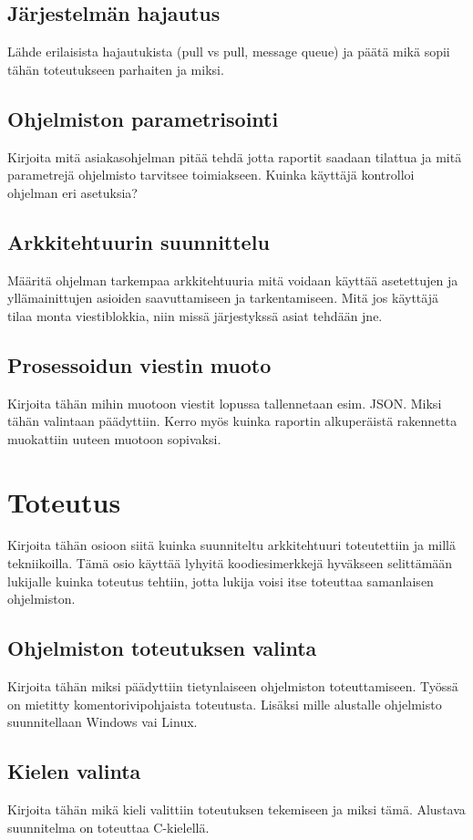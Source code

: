 \documentclass[globalnumbering,centeredcaptions,draftfooter]{tutthesis} %
\begin{document}
\section{Järjestelmän hajautus}
Lähde erilaisista hajautukista (pull vs pull, message queue) ja päätä mikä sopii tähän toteutukseen parhaiten ja miksi. 

\section{Ohjelmiston parametrisointi}
Kirjoita mitä asiakasohjelman pitää tehdä jotta raportit saadaan tilattua ja mitä parametrejä ohjelmisto tarvitsee toimiakseen. Kuinka käyttäjä kontrolloi ohjelman eri asetuksia?

\section{Arkkitehtuurin suunnittelu}
Määritä ohjelman tarkempaa arkkitehtuuria mitä voidaan käyttää asetettujen ja yllämainittujen asioiden saavuttamiseen ja tarkentamiseen. Mitä jos käyttäjä tilaa monta viestiblokkia, niin missä järjestykssä asiat tehdään jne.

\section{Prosessoidun viestin muoto}
Kirjoita tähän mihin muotoon viestit lopussa tallennetaan esim. JSON. Miksi tähän valintaan päädyttiin. Kerro myös kuinka raportin alkuperäistä rakennetta muokattiin uuteen muotoon sopivaksi.


\chapter{Toteutus}
\label{ch:toteutus}
Kirjoita tähän osioon siitä kuinka suunniteltu arkkitehtuuri toteutettiin ja millä tekniikoilla. Tämä osio käyttää lyhyitä koodiesimerkkejä hyväkseen selittämään lukijalle kuinka toteutus tehtiin, jotta lukija voisi itse toteuttaa samanlaisen ohjelmiston.

\section{Ohjelmiston toteutuksen valinta}
Kirjoita tähän miksi päädyttiin tietynlaiseen ohjelmiston toteuttamiseen. Työssä on mietitty komentorivipohjaista toteutusta. Lisäksi mille alustalle ohjelmisto suunnitellaan Windows vai Linux.

\section{Kielen valinta}
Kirjoita tähän mikä kieli valittiin toteutuksen tekemiseen ja miksi tämä. Alustava suunnitelma on toteuttaa C-kielellä.
\end{document}
